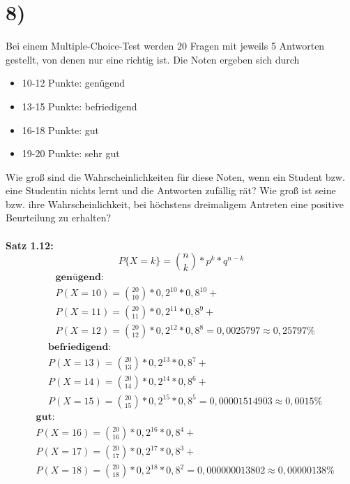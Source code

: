 \documentclass[11pt,a4paper]{article}
\begin{document}
	\section*{8)}
	Bei einem Multiple-Choice-Test werden 20 Fragen mit jeweils 5 Antworten gestellt, von denen nur eine richtig ist. Die Noten ergeben sich durch
  	\begin{itemize}
  		\item 10-12 Punkte: genügend
  		\item 13-15 Punkte: befriedigend
  		\item 16-18 Punkte: gut
  		\item 19-20 Punkte: sehr gut
  	\end{itemize}
  	Wie groß sind die Wahrscheinlichkeiten für diese Noten, wenn ein Student bzw. eine Studentin nichts lernt und die Antworten zufällig rät? Wie groß ist seine bzw. ihre Wahrscheinlichkeit, bei höchstens dreimaligem Antreten eine positive Beurteilung zu erhalten?\\
  	\\
  	\textbf{Satz 1.12:}\\
  	\[P\{X=k\} = \binom{n}{k} * p^k * q^{n-k} \]
  	\newline
  	\begin{align*}
  		& \textbf{genügend:} \\
  		& P(X=10) = \binom{20}{10} * 0,2^{10} * 0,8^{10} + \\
  		& P(X=11) = \binom{20}{11} * 0,2^{11} * 0,8^{9} + \\
  		& P(X=12) = \binom{20}{12} * 0,2^{12} * 0,8^{8} = 0,0025797 \approx 0,25797\%
  	\end{align*}
  	\begin{align*}
  		& \textbf{befriedigend:} \\
  		& P(X=13) = \binom{20}{13} * 0,2^{13} * 0,8^{7} + \\
  		& P(X=14) = \binom{20}{14} * 0,2^{14} * 0,8^{6} + \\
  		& P(X=15) = \binom{20}{15} * 0,2^{15} * 0,8^{5} = 0,00001514903 \approx 0,0015\%
  	\end{align*}
    \begin{align*}
  		& \textbf{gut:} \\
  		& P(X=16) = \binom{20}{16} * 0,2^{16} * 0,8^{4} + \\
  		& P(X=17) = \binom{20}{17} * 0,2^{17} * 0,8^{3} + \\
  		& P(X=18) = \binom{20}{18} * 0,2^{18} * 0,8^{2} = 0,000000013802 \approx 0,00000138\%
  	\end{align*}
\end{document}
